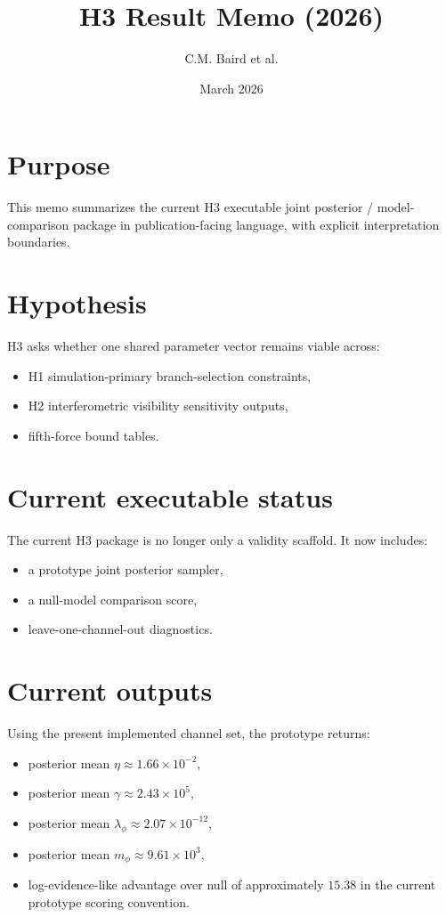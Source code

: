 \documentclass[11pt]{article}
\title{H3 Result Memo (2026)}
\author{C.M. Baird et al.}
\date{March 2026}
\begin{document}
\maketitle

\section*{Purpose}
This memo summarizes the current H3 executable joint posterior / model-comparison package in publication-facing language, with explicit interpretation boundaries.

\section*{Hypothesis}
H3 asks whether one shared parameter vector remains viable across:
\begin{itemize}
    \item H1 simulation-primary branch-selection constraints,
    \item H2 interferometric visibility sensitivity outputs,
    \item fifth-force bound tables.
\end{itemize}

\section*{Current executable status}
The current H3 package is no longer only a validity scaffold. It now includes:
\begin{itemize}
    \item a prototype joint posterior sampler,
    \item a null-model comparison score,
    \item leave-one-channel-out diagnostics.
\end{itemize}

\section*{Current outputs}
Using the present implemented channel set, the prototype returns:
\begin{itemize}
    \item posterior mean $\eta \approx 1.66\times 10^{-2}$,
    \item posterior mean $\gamma \approx 2.43\times 10^{5}$,
    \item posterior mean $\lambda_{\phi} \approx 2.07\times 10^{-12}$,
    \item posterior mean $m_{\phi} \approx 9.61\times 10^{3}$,
    \item log-evidence-like advantage over null of approximately $15.38$ in the current prototype scoring convention.
\end{itemize}
\end{document}
